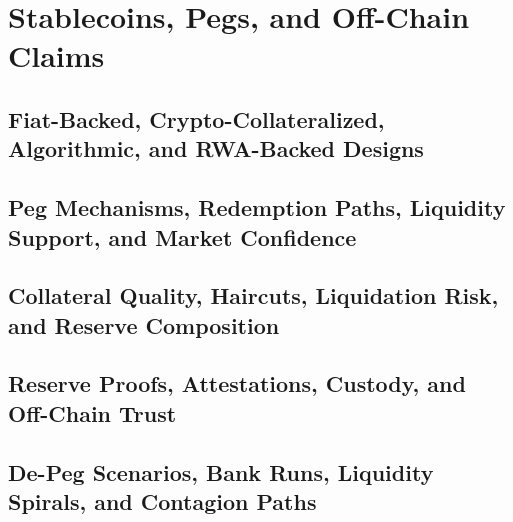 \chapter{Stablecoins, Pegs, and Off-Chain Claims}

\section{Fiat-Backed, Crypto-Collateralized, Algorithmic, and RWA-Backed Designs}

\section{Peg Mechanisms, Redemption Paths, Liquidity Support, and Market Confidence}

\section{Collateral Quality, Haircuts, Liquidation Risk, and Reserve Composition}

\section{Reserve Proofs, Attestations, Custody, and Off-Chain Trust}

\section{De-Peg Scenarios, Bank Runs, Liquidity Spirals, and Contagion Paths}
